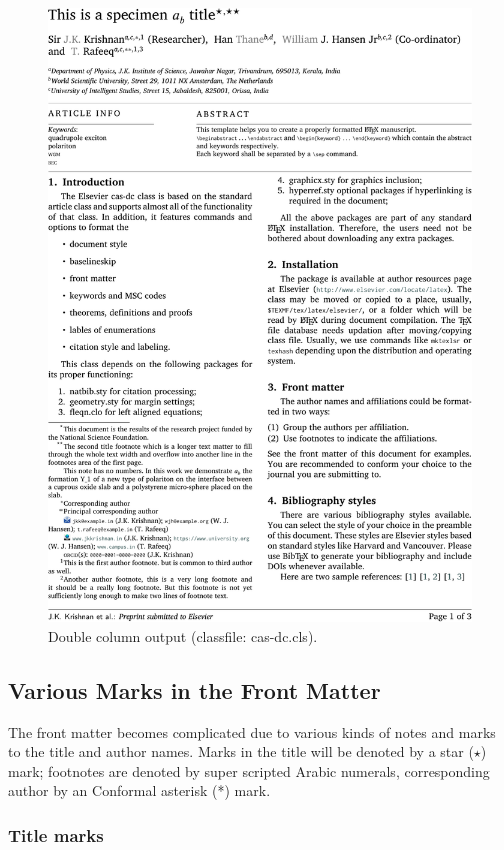 \documentclass[a4paper,12pt]{article}
\begin{document}
\begin{figure}
\includegraphics[width=\textwidth]{dc-sample.pdf}
\caption{Double column output (classfile: cas-dc.cls).}
\end{figure}

\subsection{Various Marks in the Front Matter}

The front matter becomes complicated due to various kinds
of notes and marks to the title and author names. Marks in
the title will be denoted by a star ($\star$) mark;
footnotes are denoted by super scripted Arabic numerals,
corresponding author by an Conformal asterisk (*) mark.

\subsubsection{Title marks}
\end{document}
